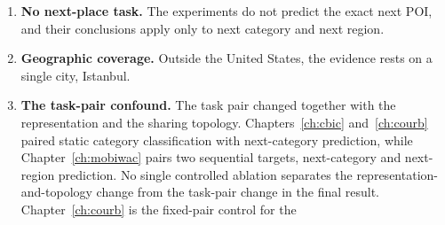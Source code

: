 \begin{enumerate}
    constraint points toward.
    \item \textbf{No next-place task.} The experiments do not predict the exact next
    POI, and their conclusions apply only to next category and next region.
    \item \textbf{Geographic coverage.} Outside the United States, the evidence rests on
    a single city, Istanbul.
    \item \textbf{The task-pair confound.} The task pair changed together with the
    representation and the sharing topology. Chapters~\ref{ch:cbic}
    and~\ref{ch:courb} paired static category classification with next-category
    prediction, while Chapter~\ref{ch:mobiwac} pairs two sequential targets,
    next-category and next-region prediction. No single controlled ablation
    separates the representation-and-topology change from the task-pair change in
    the final result. Chapter~\ref{ch:courb} is the fixed-pair control for the

\end{enumerate}
